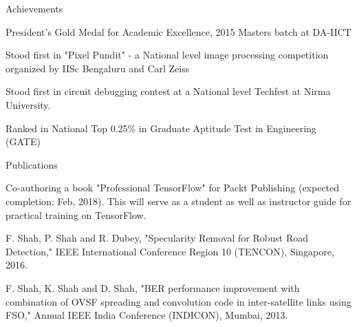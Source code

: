 \documentclass{resume} %
\begin{document}
	
	
	\begin{rSection}{Achievements} \itemsep -2pt
		\item President's Gold Medal for Academic Excellence, 2015 Masters batch at DA-IICT
		\item Stood first in "Pixel Pundit" - a National level image processing competition organized by IISc Bengaluru and Carl Zeiss
		\item Stood first in circuit debugging contest at a National level Techfest at Nirma
		University.
		\item Ranked in National Top 0.25\% in Graduate Aptitude Test in Engineering (GATE)

	\end{rSection}
	

	\begin{rSection}{Publications}
		\item Co-authoring a book "Professional TensorFlow" for Packt Publishing (expected completion: Feb, 2018). This will serve as a student as well as instructor guide for practical training on TensorFlow. 
		\item F. Shah, P. Shah and R. Dubey, "Specularity Removal for Robust Road Detection," IEEE International Conference Region 10 (TENCON), Singapore, 2016.
		\item F. Shah, K. Shah and D. Shah, "BER performance improvement with combination of OVSF spreading and convolution code in inter-satellite links using FSO," Annual IEEE India Conference (INDICON), Mumbai, 2013.
	\end{rSection}
		
\end{document}
